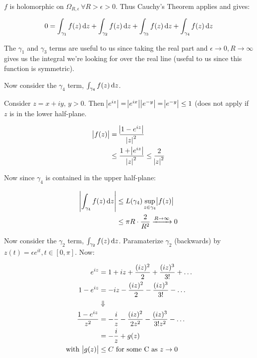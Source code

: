 \begin{example}
\begin{center}
\end{center}


$f$ is holomorphic on $\Omega_{R,\epsilon} \, \forall R > \epsilon >0 $. Thus Cauchy's Theorem applies and gives:

\begin{align*}
    0 = \int_{\gamma_1} f(z) \dif z +\int_{\gamma_2} f(z) \dif z +\int_{\gamma_3} f(z) \dif z +\int_{\gamma_4} f(z) \dif z 
\end{align*}

The $\gamma_1$ and $\gamma_3$ terms are useful to us since taking the real part and $\epsilon \to 0, R \to \infty$ gives us the integral we're looking for over the real line (useful to us since this function is symmetric).

Now consider the $\gamma_4$ term, $\int_{\gamma_4} f(z) \dif z $.

Consider $z=x+iy, \, y>0 $. Then $\abs{e^{iz}} = \abs{e^{ix}} \abs{ e^{-y}} = \abs{ e^{-y}} \leq 1 $ (does not apply if $z$ is in the lower half-plane.

\begin{align*}
    \abs{f(z)} &= \frac{\abs{1-e^{iz}}}{\abs{z}^2}\\
    & \leq \frac{1+\abs{e^{iz}}}{\abs{z}^2} \leq \frac{2}{\abs{z}^2}\\
\end{align*}

Now since $\gamma_4$ is contained in the upper half-plane:

\begin{align*}
   \abs{ \int_{\gamma_4} f(z) \dif z } &\leq L(\gamma_4) \sup_{z\in \gamma_4} \abs{f(z)}\\
   &\leq \pi R \cdot \frac{2}{R^2} \xrightarrow[]{R\to \infty} 0\\
\end{align*}


Now consider the $\gamma_2$ term, $\int_{\gamma_2} f(z) \dif z $. Paramaterize $\gamma_2$ (backwards) by $z(t) = \epsilon e^{it}, t\in [0,\pi]$. Now:

\begin{align*}
    e^{iz} &= 1 + iz + \frac{(iz)^2}{2} + \frac{(iz)^3}{3!} + \hdots\\
   1- e^{iz}  &=  -iz - \frac{(iz)^2}{2} - \frac{(iz)^3}{3!} - \hdots\\
   &\Downarrow\\
   \frac{ 1- e^{iz}}{ z^2} &= - \frac{i}{z} - \frac{(iz)^2}{2z^2} - \frac{(iz)^3}{3!z^2} - \hdots\\
   &= - \frac{i}{z} + g(z)\\
   \text{with } \abs{g(z)} &\leq C \text{ for some C as } z \to 0
\end{align*}


\end{example}
